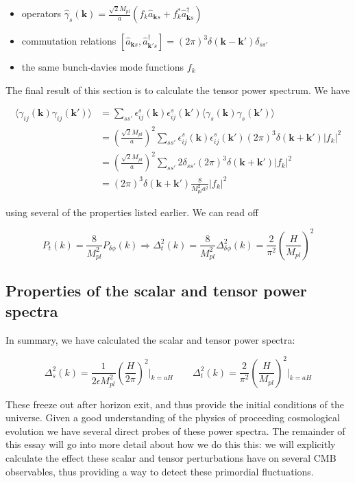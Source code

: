 \documentclass[a4paper,11pt]{article}
\renewcommand{\v}[1]{\mathbf{#1}}
\newcommand{\Mp}{M_{pl}}
\newcommand{\anns}[2]{\hat{a}_{\v{#1}#2}}
\newcommand{\cres}[2]{\hat{a}^\dagger_{\v{#1}#2}}
\begin{document}
\begin{itemize}
\item{operators $\hat{\gamma}_s(\v{k}) = \frac{\sqrt{2}\Mp}{a}(f_k\anns{k}{s}+f_k^*\cres{k}{s})$}
\item{commutation relations $[\anns{k}{s},\cres{k'}{s}] = (2\pi)^3\delta(\v{k}-\v{k'})\delta_{ss'}$}
\item{the same bunch-davies mode functions $f_k$}
\end{itemize}

The final result of this section is to calculate the tensor power spectrum. 
We have

\begin{align}
\langle\gamma_{ij}(\v{k})\gamma_{ij}(\v{k'})\rangle & = \sum_{ss'} \epsilon^s_{ij}(\v{k})\epsilon^s_{ij}(\v{k'})\langle\gamma_{s}(\v{k})\gamma_{s}(\v{k'})\rangle\\
&= (\frac{\sqrt{2}\Mp}{a})^2 \sum_{ss'} \epsilon^s_{ij}(\v{k})\epsilon^s_{ij}(\v{k'})(2\pi)^3\delta(\v{k}+\v{k'})|f_k|^2\\
&= (\frac{\sqrt{2}\Mp}{a})^2 \sum_{ss'} 2\delta_{ss'}(2\pi)^3\delta(\v{k}+\v{k'})|f_k|^2\\
&= (2\pi)^3\delta(\v{k}+\v{k'})\frac{8}{\Mp^2a^2}|f_k|^2
\end{align}

using several of the properties listed earlier. We can read off 

\begin{equation}
P_t(k)=\frac{8}{\Mp^2}P_{\delta\phi}(k) \Rightarrow \Delta^2_t(k)=\frac{8}{\Mp^2}\Delta^2_{\delta\phi}(k) = \frac{2}{\pi^2}(\frac{H}{\Mp})^2
\end{equation}


\subsection{Properties of the scalar and tensor power spectra}

In summary, we have calculated the scalar and tensor power spectra:

\begin{equation}
\Delta^2_{s}(k) = \frac{1}{2\epsilon\Mp^2}(\frac{H}{2\pi})^2\rvert_{k=aH} \qquad
\Delta^2_t(k)= \frac{2}{\pi^2}(\frac{H}{\Mp})^2\rvert_{k=aH}
\end{equation}

These freeze out after horizon exit, and thus provide the initial conditions of the universe. Given a good understanding of the physics of proceeding cosmological evolution we have several direct probes of these power spectra. The remainder of this essay will go into more detail about how we do this this: we will explicitly calculate the effect these scalar and tensor perturbations have on several CMB observables, thus providing a way to detect these primordial fluctuations.\\
\end{document}
